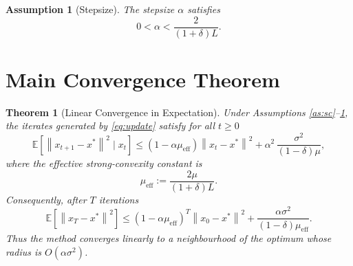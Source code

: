 \documentclass[11pt]{article}
\newtheorem{theorem}{Theorem}
\newtheorem{assumption}{Assumption}
\newcommand{\E}{\mathbb{E}}
\newcommand{\norm}[1]{\left\|#1\right\|}
\begin{document}
\begin{assumption}[Stepsize]\label{as:step}
The stepsize $\alpha$ satisfies
\[
0<\alpha<\frac{2}{(1+\delta)L}.
\]
\end{assumption}

\section*{Main Convergence Theorem}
\begin{theorem}[Linear Convergence in Expectation]\label{thm:linear}
Under Assumptions \ref{as:sc}–\ref{as:step}, the iterates generated by \eqref{eq:update} satisfy for all $t\ge0$
\begin{equation}
\label{eq:linear}
\E\!\left[\norm{x_{t+1}-x^{*}}^{2}\mid x_{t}\right]
\le\left(1-\alpha\mu_{\mathrm{eff}}\right)\norm{x_{t}-x^{*}}^{2}
+\alpha^{2}\,\frac{\sigma^{2}}{(1-\delta)\mu},
\end{equation}
where the effective strong‑convexity constant is
\[
\mu_{\mathrm{eff}}:=\frac{2\mu}{(1+\delta)L}.
\]
Consequently, after $T$ iterations
\[
\E\!\left[\norm{x_{T}-x^{*}}^{2}\right]\le
\left(1-\alpha\mu_{\mathrm{eff}}\right)^{T}\norm{x_{0}-x^{*}}^{2}
+\frac{\alpha\sigma^{2}}{(1-\delta)\mu_{\mathrm{eff}}}.
\]
Thus the method converges linearly to a neighbourhood of the optimum whose radius is $O(\alpha\sigma^{2})$.
\end{theorem}

\end{document}
